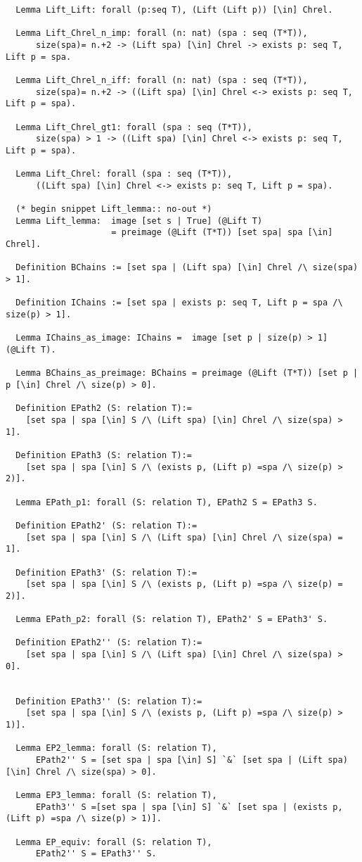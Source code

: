 \documentclass[12pt]{article}
\begin{document}
\begin{verbatim}
  Lemma Lift_Lift: forall (p:seq T), (Lift (Lift p)) [\in] Chrel. 
  
  Lemma Lift_Chrel_n_imp: forall (n: nat) (spa : seq (T*T)),
      size(spa)= n.+2 -> (Lift spa) [\in] Chrel -> exists p: seq T, Lift p = spa.
  
  Lemma Lift_Chrel_n_iff: forall (n: nat) (spa : seq (T*T)),
      size(spa)= n.+2 -> ((Lift spa) [\in] Chrel <-> exists p: seq T, Lift p = spa).
  
  Lemma Lift_Chrel_gt1: forall (spa : seq (T*T)),
      size(spa) > 1 -> ((Lift spa) [\in] Chrel <-> exists p: seq T, Lift p = spa).

  Lemma Lift_Chrel: forall (spa : seq (T*T)),
      ((Lift spa) [\in] Chrel <-> exists p: seq T, Lift p = spa).

  (* begin snippet Lift_lemma:: no-out *)  
  Lemma Lift_lemma:  image [set s | True] (@Lift T) 
                     = preimage (@Lift (T*T)) [set spa| spa [\in] Chrel].

  Definition BChains := [set spa | (Lift spa) [\in] Chrel /\ size(spa) > 1]. 

  Definition IChains := [set spa | exists p: seq T, Lift p = spa /\ size(p) > 1]. 
    
  Lemma IChains_as_image: IChains =  image [set p | size(p) > 1] (@Lift T).
  
  Lemma BChains_as_preimage: BChains = preimage (@Lift (T*T)) [set p | p [\in] Chrel /\ size(p) > 0].
  
  Definition EPath2 (S: relation T):=
    [set spa | spa [\in] S /\ (Lift spa) [\in] Chrel /\ size(spa) > 1].

  Definition EPath3 (S: relation T):=
    [set spa | spa [\in] S /\ (exists p, (Lift p) =spa /\ size(p) > 2)].

  Lemma EPath_p1: forall (S: relation T), EPath2 S = EPath3 S.

  Definition EPath2' (S: relation T):=
    [set spa | spa [\in] S /\ (Lift spa) [\in] Chrel /\ size(spa) = 1].

  Definition EPath3' (S: relation T):=
    [set spa | spa [\in] S /\ (exists p, (Lift p) =spa /\ size(p) = 2)].

  Lemma EPath_p2: forall (S: relation T), EPath2' S = EPath3' S.
  
  Definition EPath2'' (S: relation T):=
    [set spa | spa [\in] S /\ (Lift spa) [\in] Chrel /\ size(spa) > 0].
  

  Definition EPath3'' (S: relation T):=
    [set spa | spa [\in] S /\ (exists p, (Lift p) =spa /\ size(p) > 1)].
  
  Lemma EP2_lemma: forall (S: relation T), 
      EPath2'' S = [set spa | spa [\in] S] `&` [set spa | (Lift spa)  [\in] Chrel /\ size(spa) > 0].

  Lemma EP3_lemma: forall (S: relation T), 
      EPath3'' S =[set spa | spa [\in] S] `&` [set spa | (exists p, (Lift p) =spa /\ size(p) > 1)].

  Lemma EP_equiv: forall (S: relation T), 
      EPath2'' S = EPath3'' S.
\end{verbatim}
\end{document}
